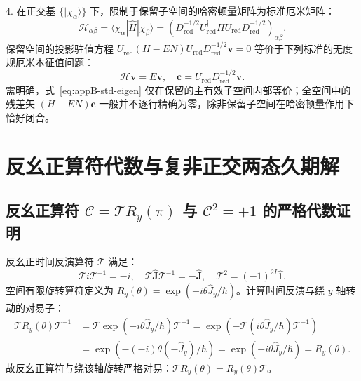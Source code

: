 4. 在正交基 $\{ |\chi_\alpha\rangle \}$ 下，限制于保留子空间的哈密顿量矩阵为标准厄米矩阵：
\begin{equation}\label{eq:appB-H-canonical}
\mathcal{H}_{\alpha\beta} = \langle \chi_\alpha | \hat{H} | \chi_\beta \rangle = \left( D_{\text{red}}^{-1/2} U_{\text{red}}^\dagger H U_{\text{red}} D_{\text{red}}^{-1/2} \right)_{\alpha\beta}.
\end{equation}
保留空间的投影驻值方程 $U_{\text{red}}^\dagger (H - E N) U_{\text{red}} D_{\text{red}}^{-1/2} \mathbf{v} = 0$ 等价于下列标准的无度规厄米本征值问题：
\begin{equation}\label{eq:appB-std-eigen}
\mathcal{H} \mathbf{v} = E \mathbf{v}, \quad \mathbf{c} = U_{\text{red}} D_{\text{red}}^{-1/2} \mathbf{v}.
\end{equation}
需明确，式~\eqref{eq:appB-std-eigen} 仅在保留的主有效子空间内部等价；全空间中的残差矢 $(H - EN)\mathbf{c}$ 一般并不逐行精确为零，除非保留子空间在哈密顿量作用下恰好闭合。

\section{反幺正算符代数与复非正交两态久期解}\label{sec:appB-3}

\subsection{反幺正算符 $\mathcal{C} = \mathcal{T} R_y(\pi)$ 与 $\mathcal{C}^2 = +1$ 的严格代数证明}

反幺正时间反演算符 $\mathcal{T}$ 满足：
\begin{equation}\label{eq:appB-T-prop}
\mathcal{T} i \mathcal{T}^{-1} = -i, \quad \mathcal{T} \hat{\mathbf{J}} \mathcal{T}^{-1} = -\hat{\mathbf{J}}, \quad \mathcal{T}^2 = (-1)^{2I} \hat{\mathbf{1}}.
\end{equation}
空间有限旋转算符定义为 $R_y(\theta) = \exp(-i \theta \hat{J}_y / \hbar)$。计算时间反演与绕 $y$ 轴转动的对易子：
\begin{align}
\mathcal{T} R_y(\theta) \mathcal{T}^{-1} &= \mathcal{T} \exp(-i \theta \hat{J}_y / \hbar) \mathcal{T}^{-1} = \exp\left( - \mathcal{T} (i \theta \hat{J}_y / \hbar) \mathcal{T}^{-1} \right) \nonumber \\
&= \exp\left( - (-i) \theta (-\hat{J}_y) / \hbar \right) = \exp(-i \theta \hat{J}_y / \hbar) = R_y(\theta).
\end{align}
故反幺正算符与绕该轴旋转严格对易：$\mathcal{T} R_y(\theta) = R_y(\theta) \mathcal{T}$。

